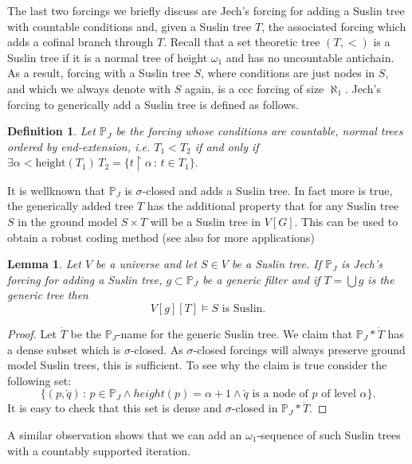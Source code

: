 \documentclass[a4paper,11pt]{article}
\newtheorem{lemma}[theorem]{Lemma}
\newtheorem{definition}[theorem]{Definition}
\newcommand{\forceP}{\mathbb{P}}
\begin{document}
The last two forcings we briefly discuss are Jech's forcing for adding a Suslin tree with countable conditions and, given a Suslin tree $T$, the associated forcing which adds a cofinal branch through $T$. 
Recall that a set theoretic tree $(T, <)$ is a Suslin tree if it is a normal tree of height $\omega_1$
and has no uncountable antichain. As a result, forcing with a Suslin tree $S$, where conditions are just nodes in $S$, and which we always denote with $S$ again, is a ccc forcing of size $\aleph_1$. 
Jech's forcing to generically add a Suslin tree is defined as follows.

\begin{definition}
 Let $\forceP_J$ be the forcing whose conditions are
 countable, normal trees ordered by end-extension, i.e. $T_1 < T_2$ if and only
 if $\exists \alpha < \text{height}(T_1) \, T_2= \{ t \upharpoonright \alpha \, : \, t \in T_1 \}.$
\end{definition}
It is wellknown that $\forceP_J$ is $\sigma$-closed and
adds a Suslin tree. In fact more is true, the generically added tree $T$ has 
the additional property that for any Suslin tree $S$ in the ground model
$S \times T$ will be a Suslin tree in $V[G]$. This can be used to obtain a robust coding method (see also \cite{Ho} for more applications)

\begin{lemma}\label{oneSuslintreepreservation}
 Let $V$ be a universe and let $S \in V$ be a Suslin tree. If $\forceP_J$ is 
 Jech's forcing for adding a Suslin tree, $g \subset \forceP_J$ be a generic filter and if $T=\bigcup g$ is the generic tree
 then $$V[g][T] \models  S \text{ is Suslin.}$$
\end{lemma}

\begin{proof}
Let $\dot{T}$ be the $\forceP_J$-name for the generic Suslin tree. We claim that $\forceP_J \ast \dot{T}$ has a dense subset which is $\sigma$-closed. As $\sigma$-closed forcings will always preserve ground model Suslin trees, this is sufficient. To see why the claim is true consider the following set:
$$\{ (p, \check{q}) \, : \, p \in \forceP_J \land height(p)= \alpha+1  \land  \check{q} \text{ is a node of $p$ of level } \alpha \}.$$
It is easy to check that this set is dense and $\sigma$-closed in $\forceP_J \ast \dot{T}$.

\end{proof}


A similar observation shows that we can add an $\omega_1$-sequence of
such Suslin trees with a countably supported iteration. 
\end{document}
